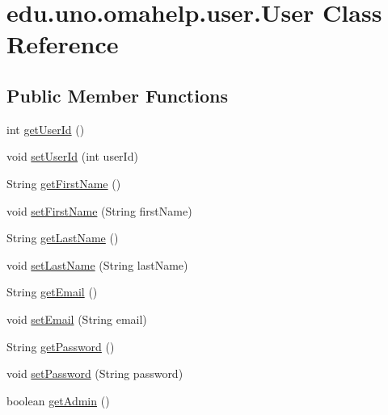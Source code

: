 \hypertarget{classedu_1_1uno_1_1omahelp_1_1user_1_1_user}{}\section{edu.\+uno.\+omahelp.\+user.\+User Class Reference}
\label{classedu_1_1uno_1_1omahelp_1_1user_1_1_user}
\subsection*{Public Member Functions}
\begin{DoxyCompactItemize}
\item 
int \mbox{\hyperlink{classedu_1_1uno_1_1omahelp_1_1user_1_1_user_ac6292daa9dbf659897c0737125898cfb}{get\+User\+Id}} ()
\item 
void \mbox{\hyperlink{classedu_1_1uno_1_1omahelp_1_1user_1_1_user_a0ac21640eb5a16a2ea50f37e7e07d025}{set\+User\+Id}} (int user\+Id)
\item 
String \mbox{\hyperlink{classedu_1_1uno_1_1omahelp_1_1user_1_1_user_aa1b0e5a5e7716c13ccbc4f1a96178de2}{get\+First\+Name}} ()
\item 
void \mbox{\hyperlink{classedu_1_1uno_1_1omahelp_1_1user_1_1_user_ac5c0877932afe84857910897723a9f46}{set\+First\+Name}} (String first\+Name)
\item 
String \mbox{\hyperlink{classedu_1_1uno_1_1omahelp_1_1user_1_1_user_ab83571bacf7c67c22f02e744ec5e2883}{get\+Last\+Name}} ()
\item 
void \mbox{\hyperlink{classedu_1_1uno_1_1omahelp_1_1user_1_1_user_a3dd4bef05ab4ff091637296dba2c860d}{set\+Last\+Name}} (String last\+Name)
\item 
String \mbox{\hyperlink{classedu_1_1uno_1_1omahelp_1_1user_1_1_user_a917ce4b8235914cf18e424034c152825}{get\+Email}} ()
\item 
void \mbox{\hyperlink{classedu_1_1uno_1_1omahelp_1_1user_1_1_user_a513f3606c2a7313df9e04dce2b9b6a9b}{set\+Email}} (String email)
\item 
String \mbox{\hyperlink{classedu_1_1uno_1_1omahelp_1_1user_1_1_user_aa90125f1dd5f6db3cacee624d4b774a3}{get\+Password}} ()
\item 
void \mbox{\hyperlink{classedu_1_1uno_1_1omahelp_1_1user_1_1_user_a0ac39208ef908307df6146a676c2c1f9}{set\+Password}} (String password)
\item 
boolean \mbox{\hyperlink{classedu_1_1uno_1_1omahelp_1_1user_1_1_user_afada28e82c04dede8419dd44e87e885d}{get\+Admin}} ()
\item 

\end{DoxyCompactItemize}
